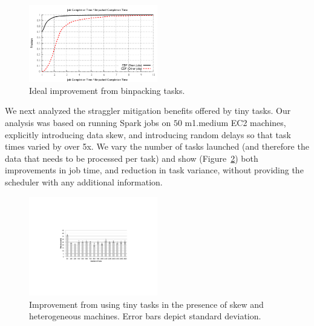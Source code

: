 \begin{figure}[!ht]
\centering
\hspace{2ex}
\includegraphics[width=0.5\textwidth]{figures/binpacked1-sep}
\vspace{-4ex}
\caption{Ideal improvement from binpacking tasks.}
\vspace{-2ex}
\label{fig:binpacked}
\end{figure}


We next analyzed the straggler mitigation benefits offered by tiny tasks. Our analysis was based on running
Spark jobs on $50$ m1.medium EC2 machines, explicitly introducing data skew, and introducing random delays
so that task times varied by over 5x. We vary the number of tasks launched (and therefore the data that
needs to be processed per task) and show (Figure~\ref{fig:sparkskew}) both improvements in job time,
and reduction in task variance, without providing the scheduler with any additional information.

\begin{figure}[!ht]
\centering
\hspace{2ex}
\includegraphics[width=0.5\textwidth]{figures/spark-skew-results}
\vspace{-4ex}
\caption{Improvement from using tiny tasks in the presence of skew and heterogeneous machines. Error bars depict standard deviation.}
\vspace{-2ex}
\label{fig:sparkskew}
\end{figure}



